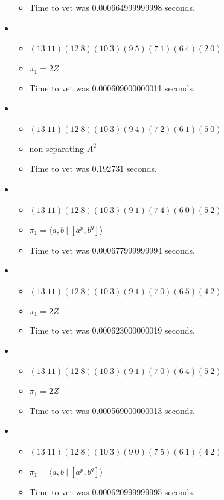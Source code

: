\documentclass{article}
\begin{document}
\begin{itemize}
\begin{itemize}
      \item Time to vet was 0.000664999999998 seconds.
\end{itemize}
\item \begin{itemize}
      \item $(13\ 11)(12\ 8)(10\ 3)(9\ 5)(7\ 1)(6\ 4)(2\ 0)$
      \item $\pi_1 =2 Z$
      \item Time to vet was 0.000609000000011 seconds.
\end{itemize}
\item \begin{itemize}
      \item $(13\ 11)(12\ 8)(10\ 3)(9\ 4)(7\ 2)(6\ 1)(5\ 0)$
      \item non-separating $A^2$
      \item Time to vet was 0.192731 seconds.
\end{itemize}
\item \begin{itemize}
      \item $(13\ 11)(12\ 8)(10\ 3)(9\ 1)(7\ 4)(6\ 0)(5\ 2)$
      \item $\pi_1 = \langle a,b\ |\ [a^p,b^q]\rangle$
      \item Time to vet was 0.000677999999994 seconds.
\end{itemize}
\item \begin{itemize}
      \item $(13\ 11)(12\ 8)(10\ 3)(9\ 1)(7\ 0)(6\ 5)(4\ 2)$
      \item $\pi_1 =2 Z$
      \item Time to vet was 0.000623000000019 seconds.
\end{itemize}
\item \begin{itemize}
      \item $(13\ 11)(12\ 8)(10\ 3)(9\ 1)(7\ 0)(6\ 4)(5\ 2)$
      \item $\pi_1 =2 Z$
      \item Time to vet was 0.000569000000013 seconds.
\end{itemize}
\item \begin{itemize}
      \item $(13\ 11)(12\ 8)(10\ 3)(9\ 0)(7\ 5)(6\ 1)(4\ 2)$
      \item $\pi_1 = \langle a,b\ |\ [a^p,b^q]\rangle$
      \item Time to vet was 0.000620999999995 seconds.

\end{itemize}
\end{itemize}
\end{document}
